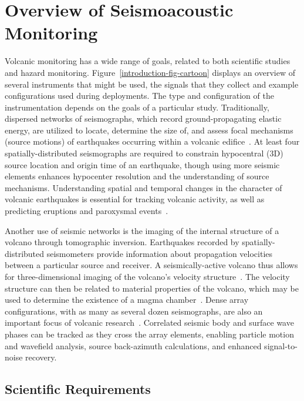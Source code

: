 \section{Overview of Seismoacoustic Monitoring}

Volcanic monitoring has a wide range of goals, related to both scientific
studies and hazard monitoring. Figure~\ref{introduction-fig-cartoon} displays
an overview of several instruments that might be used, the signals that they
collect and example configurations used during deployments. The type and
configuration of the instrumentation depends on the goals of a particular
study. Traditionally, dispersed networks of seismographs, which record
ground-propagating elastic energy, are utilized to locate, determine the size
of, and assess focal mechanisms (source motions) of earthquakes occurring
within a volcanic edifice~\cite{Chouet03}. At least four
spatially-distributed seismographs are required to constrain hypocentral (3D)
source location and origin time of an earthquake, though using more seismic
elements enhances hypocenter resolution and the understanding of source
mechanisms. Understanding spatial and temporal changes in the character of
volcanic earthquakes is essential for tracking volcanic activity, as well as
predicting eruptions and paroxysmal events~\cite{McNutt96}.

Another use of seismic networks is the imaging of the internal structure of a
volcano through tomographic inversion. Earthquakes recorded by
spatially-distributed seismometers provide information about propagation
velocities between a particular source and receiver. A seismically-active
volcano thus allows for three-dimensional imaging of the volcano's velocity
structure~\cite{Benz96,Phillips91}. The velocity structure can then be
related to material properties of the volcano, which may be used to determine
the existence of a magma chamber~\cite{Lees89,Moran99}. Dense array
configurations, with as many as several dozen seismographs, are also an
important focus of volcanic research~\cite{Dietel89,Neuberg94}. Correlated
seismic body and surface wave phases can be tracked as they cross the array
elements, enabling particle motion and wavefield analysis, source
back-azimuth calculations, and enhanced signal-to-noise recovery.

\subsection{Scientific Requirements}

